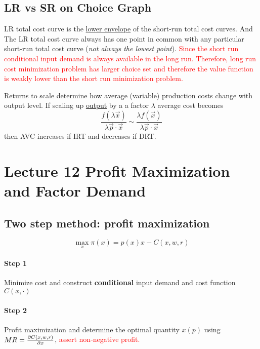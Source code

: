 \documentclass[]{article}
\begin{document}
        \subsection{LR vs SR on Choice Graph}
            \begin{remark}
                LR total cost curve is the \ul{lower envelope} of the short-run total cost curves. And The LR total cost curve always has one point in common with any particular short-run total cost curve (\emph{not always the lowest point}). \textcolor{red}{Since the short run conditional input demand is always available in the long run. Therefore, long run cost minimization problem has larger choice set and therefore the value function is weakly lower than the short run minimization problem.}
            \end{remark}
            
            \begin{remark}
                Returns to scale determine how average (variable) production costs change with output level. If scaling up \ul{output} by a a factor $\lambda$ average cost becomes
                \[
                    \frac{f(\lambda \vec{x})}{\lambda \vec{p} \cdot \vec{x}} \sim \frac{\lambda f(\vec{x})}{\lambda \vec{p} \cdot \vec{x}}
                \]
                then AVC increases if IRT and decreases if DRT.
            \end{remark}
    
    \section{Lecture 12 Profit Maximization and Factor Demand}
        \subsection{Two step method: profit maximization}
            \[
                \max_x \pi(x) = p(x)x - C(x, w, r)
            \]
            \paragraph{Step 1} Minimize cost and construct \textbf{conditional} input demand and cost function $C(x, \cdot)$
            \paragraph{Step 2} Profit maximization and determine the optimal quantity $x(p)$ using $MR = \frac{\partial{C(x, w, r)}}{\partial{x}}$, \textcolor{red}{assert non-negative profit.}
\end{document}
